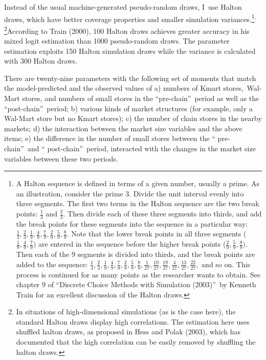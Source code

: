 \documentclass[notitlepage,onecolumn,11pt]{article}
\begin{document}
Instead of the usual machine-generated pseudo-random draws, I\ use Halton
draws, which have better coverage properties and smaller simulation
variances.\footnote{%
A Halton sequence is defined in terms of a given number, usually a prime. As
an illustration, consider the prime 3. Divide the unit interval evenly into
three segments. The first two terms in the Halton sequence are the two break
points: $\frac{1}{3}$ and $\frac{2}{3}.$ Then divide each of these three
segments into thirds, and add the break points for these segments into the
sequence in a particular way: $\frac{1}{3},\frac{2}{3},\frac{1}{9},\frac{4}{9%
},\frac{7}{9},\frac{2}{9},\frac{5}{9},\frac{8}{9}.$ Note that the lower
break points in all three segments ($\frac{1}{9},\frac{4}{9},\frac{7}{9})$
are entered in the sequence before the higher break points ($\frac{2}{9},%
\frac{5}{9},\frac{8}{9}).$ Then each of the 9 segments is divided into
thirds, and the break points are added to the sequence: $\frac{1}{3},\frac{2%
}{3},\frac{1}{9},\frac{4}{9},\frac{7}{9},\frac{2}{9},\frac{5}{9},\frac{8}{9},%
\frac{1}{27},\frac{10}{27},\frac{19}{27},\frac{4}{27},\frac{13}{27},\frac{22%
}{27},$ and so on. This process is continued for as many points as the
researcher wants to obtain. See chapter 9 of \textquotedblleft Discrete
Choice Methods with Simulation (2003)\textquotedblright\ by Kenneth Train
for an excellent discussion of the Halton draws.}$^{,}$\footnote{%
In situations of high-dimensional simulations (as is the case here), the
standard Halton draws display high correlations. The estimation here uses
shuffled halton draws, as proposed in Hess and Polak (2003), which has
documented that the high correlation can be easily removed by shuffling the
halton draws.}According to Train (2000), 100 Halton draws achieves greater
accuracy in his mixed logit estimation than 1000 pseudo-random draws. The
parameter estimation exploits 150 Halton simulation draws while the variance
is calculated with 300 Halton draws.

There are twenty-nine parameters with the following set of moments that
match the model-predicted and the observed values of a) numbers of Kmart
stores,\ Wal-Mart stores, and numbers of small stores in the
\textquotedblleft pre-chain\textquotedblright\ period as well as the
\textquotedblleft post-chain\textquotedblright\ period; b) various kinds of
market structures (for example, only a Wal-Mart store but no Kmart stores);
c) the number of chain stores in the nearby markets; d) the interaction
between the market size variables and the above items; e) the difference in
the number of small stores between the \textquotedblleft
pre-chain\textquotedblright\ and \textquotedblleft
post-chain\textquotedblright\ period, interacted with the changes in the
market size variables between these two periods.
\end{document}
